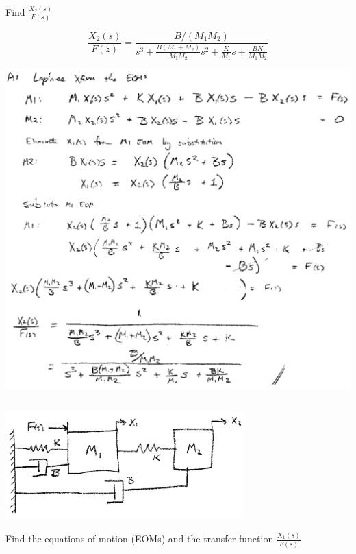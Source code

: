 \documentclass{article}	%
\begin{document}
\subsubsection{} Find $\frac{X_2(s)}{F(s)}$

\begin{solution}

\[
\frac{X_2(s)}{F(z)} = \frac  {B/(M_1M_2)}     {s^3 + \frac{B(M_1+M_2)}{M_1M_2}s^2 + \frac{K}{M_1}s + \frac{BK}{M_1M_2}}
\]

\includegraphics[width=6.25in]{00942a.png}
\end{solution}


\subsection{}


\includegraphics[width=92mm]{00452a.png}

Find the equations of motion (EOMs)  and the transfer function  $\frac{X_1(s)}{F(s)}$
\end{document}
